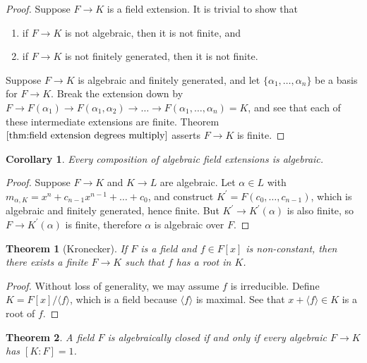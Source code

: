 \documentclass[
    parskip=half,
    toc=flat,
    toc=sectionentrydotfill,
]{scrartcl}  %
\theoremstyle{definition}
\theoremstyle{plain}
\newtheorem{theorem}{Theorem}[section]
\newtheorem{corollary}{Corollary}[theorem]
\theoremstyle{remark}
\begin{document}
\begin{proof}
    Suppose $F\to K$ is a field extension.
    It is trivial to show that
    \begin{enumerate}
        \item if $F\to K$ is not algebraic, then it is not finite, and
        \item if $F\to K$ is not finitely generated, then it is not finite.
    \end{enumerate}

    Suppose $F\to K$ is algebraic and finitely generated, and let $\{\alpha_1,\dots,\alpha_n\}$ be a basis for
    $F\to K$.
    Break the extension down by $F\to F(\alpha_1)\to F(\alpha_1,\alpha_2)\to\dots\to F(\alpha_1,\dots,\alpha_n)=K$, and
    see that each of these intermediate extensions are finite.
    Theorem $\ref{thm:field extension degrees multiply}$ asserts $F\to K$ is finite.
\end{proof}

\begin{corollary}
    Every composition of algebraic field extensions is algebraic.
\end{corollary}

\begin{proof}
    Suppose $F\to K$ and $K\to L$ are algebraic.
    Let $\alpha\in L$ with $m_{\alpha,K}=x^n+c_{n-1}x^{n-1}+\dots+c_0$, and construct $K^\prime=F(c_0,\dots,c_{n-1})$,
    which is algebraic and finitely generated, hence finite.
    But $K^\prime\to K^\prime(\alpha)$ is also finite, so $F\to K^\prime(\alpha)$ is finite, therefore $\alpha$ is
    algebraic over $F$.
\end{proof}

\begin{theorem}[Kronecker]
    \label{thm:Kronecker}
    If $F$ is a field and $f\in F[x]$ is non-constant, then there exists a finite $F\to K$ such that $f$ has a root in
    $K$.
\end{theorem}

\begin{proof}
    Without loss of generality, we may assume $f$ is irreducible.
    Define $K=F[x]/\langle f\rangle$, which is a field because $\langle f\rangle$ is maximal.
    See that $x+\langle f\rangle\in K$ is a root of $f$.
\end{proof}

\begin{theorem}
    A field $F$ is algebraically closed if and only if every algebraic $F\to K$ has $[K:F]=1$.
\end{theorem}
\end{document}
